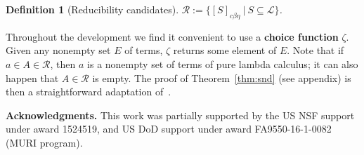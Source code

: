\documentclass{article}
\newcommand{\choice}[0]{\zeta}
\newcommand{\cbe}[0]{c\beta\eta}
\newtheorem{definition}[theorem]{Definition}
\begin{document}
\begin{definition}[Reducibility candidates]
  $\mathcal{R} := \{ [S]_{\cbe}\ |\ S\subseteq \mathcal{L} \}$.
\end{definition}

Throughout the development we find it convenient to use a
\textbf{choice function} $\choice$.  Given any nonempty set $E$ of
terms, $\choice$ returns some element of $E$.  Note that if $a \in A
\in \mathcal{R}$, then $a$ is a nonempty set of terms of pure lambda
calculus; it can also happen that $A \in\mathcal{R}$ is empty.  The
proof of Theorem~\ref{thm:snd} (see appendix) is then a straightforward adaptation of~\cite{stump17}. 

\textbf{Acknowledgments.}  This work was partially supported by the US
NSF support under award 1524519, and US DoD support under award
FA9550-16-1-0082 (MURI program).
\end{document}
